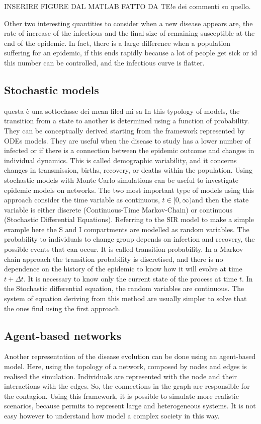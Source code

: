 INSERIRE FIGURE DAL MATLAB FATTO DA TE!e dei commenti su quello. 

Other two interesting quantities to consider when a new disease appears are, the rate of increase of the infectious and the final size of remaining susceptible at the end of the epidemic. In fact, there is a large difference when a population suffering for an epidemic, if this ends rapidly because a lot of people get sick or id this number can be controlled, and the infectious curve is flatter.

\subsection{Stochastic models} 	questa è una sottoclasse dei mean filed mi sa
In this typology of models, the transition from a state to another is determined using a function of probability. They can be conceptually derived starting from the framework represented by ODEs models. They are useful when the disease to study has a lower number of infected or if there is a connection between the epidemic outcome and changes in individual dynamics. This is called demographic variability, and it concerns changes in transmission, births, recovery, or deaths within the population. Using stochastic models with Monte Carlo simulations can be useful to investigate epidemic models on networks. 
The two most important type of models using this approach consider the time variable as continuous, $t \in [0, \infty) $and then the state variable is either discrete (Continuous-Time Markov-Chain) or continuous (Stochastic Differential Equations).
Referring to the SIR model to make a simple example here the S and I compartments are modelled as random variables. The probability to individuals to change group depends on infection and recovery, the possible events that can occur. It is called transition probability. 
In a Markov chain approach the transition probability is discretised, and there is no dependence on the history of the epidemic to know how it will evolve at time $t + \Delta t$. It is necessary to know only the current state of the process at time $t$. 
In the Stochastic differential equation, the random variables are continuous. The system of equation deriving from this method are usually simpler to solve that the ones find using the first approach\cite{Allen2017}.  

\subsection{Agent-based networks}
Another representation of the disease evolution can be done using an agent-based model. Here, using the topology of a network, composed by nodes and edges is realised the simulation. Individuals are represented with the node and their interactions with the edges. So, the connections in the graph are responsible for the contagion. Using this framework, it is possible to simulate more realistic scenarios, because permits to represent large and heterogeneous systems. It is not easy however to understand how model a complex society in this way.  

